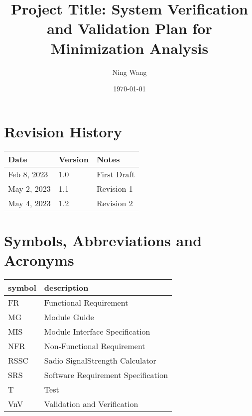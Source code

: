\documentclass[12pt, titlepage]{article}
\begin{document}
\title{Project Title: System Verification and Validation Plan for Minimization Analysis} 
\author{Ning Wang}
\date{\today}
	
\maketitle


\section{Revision History}

\begin{tabularx}{\textwidth}{p{3cm}p{2cm}X}
\toprule {\bf Date} & {\bf Version} & {\bf Notes}\\
\midrule
Feb 8, 2023 & 1.0 & First Draft\\
May 2, 2023 & 1.1 & Revision 1\\
May 4, 2023 & 1.2 & Revision 2\\
\bottomrule
\end{tabularx}

\newpage

\tableofcontents

\listoftables



\newpage

\section{Symbols, Abbreviations and Acronyms}

\renewcommand{\arraystretch}{1.2}
\begin{tabular}{l l} 
  \toprule		
  \textbf{symbol} & \textbf{description}\\
  \midrule 
  FR & Functional Requirement\\
  MG & Module Guide\\
  MIS & Module Interface Specification\\
  NFR & Non-Functional Requirement\\
  RSSC & Sadio SignalStrength Calculator\\
  SRS & Software Requirement Specification\\
  T & Test\\
  VnV & Validation and Verification\\
  \bottomrule
\end{tabular}\\
\end{document}
